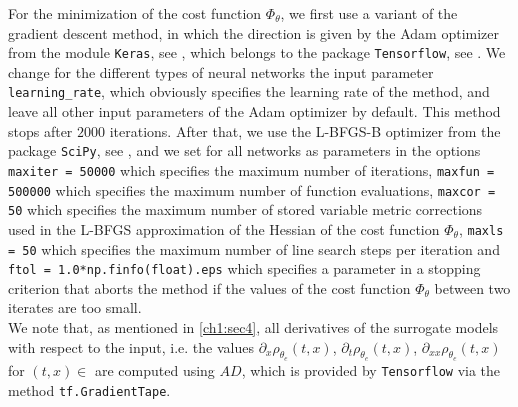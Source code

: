 For the minimization of the cost function $\Phi_{\theta}$, we first use a variant of the gradient descent method, in which the direction is given by the Adam optimizer from the module \lstinline!Keras!, see \cite{Chollet:2015}, which belongs to the package \lstinline!Tensorflow!, see \cite{TensorFlow}. We change for the different types of neural networks the input parameter \lstinline!learning_rate!, which obviously specifies the learning rate of the method, and leave all other input parameters of the Adam optimizer by default. This method stops after $2000$ iterations. After that, we use the L-BFGS-B optimizer from the package \lstinline!SciPy!, see \cite{SciPy:2020}, and we set for all networks as parameters in the options \lstinline!maxiter = 50000! which specifies the maximum number of iterations, \lstinline!maxfun = 500000! which specifies the maximum number of function evaluations, \lstinline!maxcor = 50! which specifies the maximum number of stored variable metric corrections used in the L-BFGS approximation of the Hessian of the cost function $\Phi_{\theta}$, \lstinline!maxls = 50! which specifies the maximum number of line search steps per iteration and \lstinline!ftol = 1.0*np.finfo(float).eps! which specifies a parameter in a stopping criterion that aborts the method if the values of the cost function $\Phi_{\theta}$ between two iterates are too small. \\
We note that, as mentioned in \cref{ch1:sec4}, all derivatives of the surrogate models with respect to the input, i.e. the values $\partial_x \rho_{\theta_e}  \left( t, x \right)$, $\partial_t \rho_{\theta_e}  \left( t, x \right)$, $\partial_{xx} \rho_{\theta_e}  \left( t, x \right)$ for $(t, x) \in $ are computed using $AD$, which is provided by \lstinline!Tensorflow! via the method \lstinline!tf.GradientTape!. \\


\begin{table}[H]\label{tab:one_cost_function}
    \caption{The values of the cost function and the L-error with respect to the values generated by the FVM method of the neural networks defined  after the learning phase. }
\end{table}

